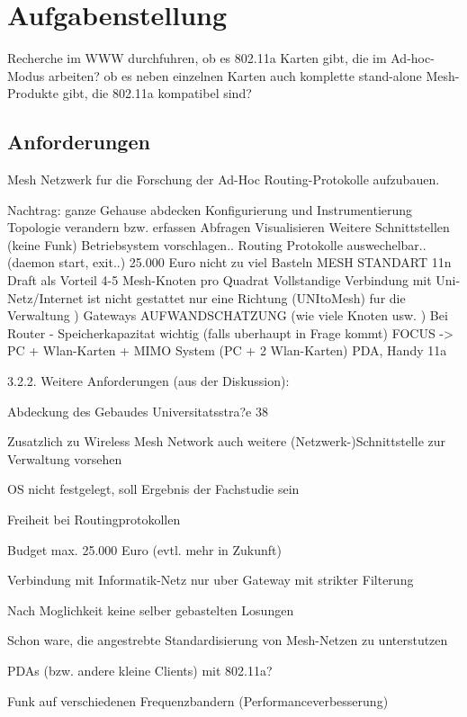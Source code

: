 \section{Aufgabenstellung}

Recherche im WWW durchfuhren, 
ob es 802.11a Karten gibt, die im Ad-hoc-Modus arbeiten? 
ob es neben einzelnen Karten auch komplette stand-alone Mesh-Produkte gibt, die 802.11a kompatibel sind? 


\subsection{Anforderungen}

Mesh Netzwerk fur die Forschung der Ad-Hoc Routing-Protokolle aufzubauen. 

Nachtrag: 
ganze Gehause abdecken 
Konfigurierung und Instrumentierung 
Topologie verandern bzw. erfassen 
Abfragen Visualisieren 
Weitere Schnittstellen (keine Funk) 
Betriebsystem vorschlagen.. 
Routing Protokolle auswechelbar.. (daemon start, exit..) 
25.000 Euro 
nicht zu viel Basteln 
MESH STANDART 11n Draft als Vorteil 
4-5 Mesh-Knoten pro Quadrat 
Vollstandige Verbindung mit Uni-Netz/Internet ist nicht gestattet 
nur eine Richtung (UNItoMesh) fur die Verwaltung ) 
Gateways 
AUFWANDSCHATZUNG (wie viele Knoten usw. ) 
Bei Router - Speicherkapazitat wichtig (falls uberhaupt in Frage kommt) 
FOCUS -> PC + Wlan-Karten + 
MIMO System (PC + 2 Wlan-Karten) 
PDA, Handy 11a 

3.2.2. Weitere Anforderungen (aus der Diskussion): 

Abdeckung des Gebaudes Universitatsstra?e 38 

Zusatzlich zu Wireless Mesh Network auch weitere (Netzwerk-)Schnittstelle zur Verwaltung vorsehen 

OS nicht festgelegt, soll Ergebnis der Fachstudie sein 

Freiheit bei Routingprotokollen 

Budget max. 25.000 Euro (evtl. mehr in Zukunft) 

Verbindung mit Informatik-Netz nur uber Gateway mit strikter Filterung 

Nach Moglichkeit keine selber gebastelten Losungen 

Schon ware, die angestrebte Standardisierung von Mesh-Netzen zu unterstutzen 

PDAs (bzw. andere kleine Clients) mit 802.11a? 

Funk auf verschiedenen Frequenzbandern (Performanceverbesserung) 

